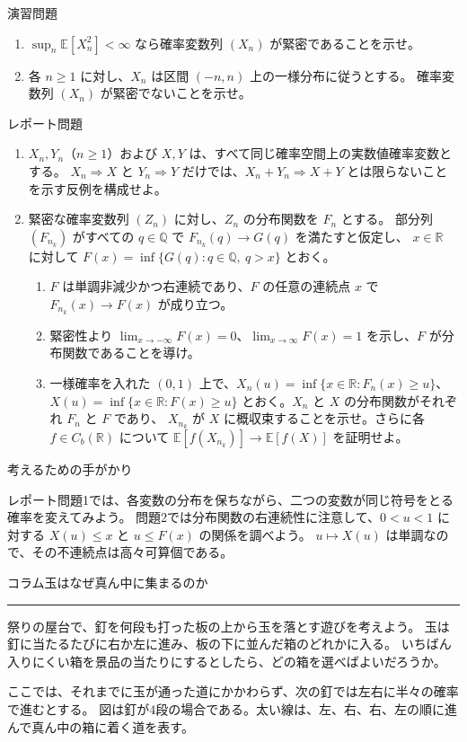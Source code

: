 \documentclass[a4paper,10pt,pdflatex,ja=standard,jafont=ipaex-type1,
  magstyle=real,scale=1]{bxjsarticle}
\newcommand{\coursename}{確率論と統計学 I}
\newcommand{\topic}[1]{\par\vspace{5pt}
  {\large\sffamily\mdseries\color{accent}#1}\par\vspace{2pt}}
\newcommand{\handouttitle}[1]{%
  \begin{center}
    {\Large\color{ink}#1}\par\vspace{3mm}
    {\color{accent}\rule{0.88\linewidth}{0.7pt}}
  \end{center}\vspace{-2mm}}
\newcommand{\columnstart}[1]{\clearpage
  \setlength{\parskip}{2.5pt}
  \fancyhead[L]{\small\color{ink}\coursename{}・コラム}
  \handouttitle{コラム\quad #1}}
\newcommand{\R}{\mathbb R}
\newcommand{\E}{\mathbb E}
\begin{document}
\topic{演習問題}
\begin{enumerate}[label=\arabic*.]
\item $\sup_n\E[X_n^2]<\infty$ なら確率変数列 $(X_n)$ が緊密であることを示せ。
\item 各 $n\ge1$ に対し、$X_n$ は区間 $(-n,n)$ 上の一様分布に従うとする。
確率変数列 $(X_n)$ が緊密でないことを示せ。
\end{enumerate}

\topic{レポート問題}
\begin{enumerate}[label=\arabic*.]
\item $X_n,Y_n$（$n\ge1$）および $X,Y$ は、すべて同じ確率空間上の実数値確率変数とする。
$X_n\Rightarrow X$ と $Y_n\Rightarrow Y$ だけでは、$X_n+Y_n\Rightarrow X+Y$ とは限らないことを示す反例を構成せよ。
\item 緊密な確率変数列 $(Z_n)$ に対し、$Z_n$ の分布関数を $F_n$ とする。
部分列 $(F_{n_k})$ がすべての $q\in\mathbb Q$ で $F_{n_k}(q)\to G(q)$ を満たすと仮定し、
$x\in\R$ に対して $F(x)=\inf\{G(q):q\in\mathbb Q,\ q>x\}$ とおく。
\begin{enumerate}[label=(\arabic*),leftmargin=2.1em]
\item $F$ は単調非減少かつ右連続であり、$F$ の任意の連続点 $x$ で $F_{n_k}(x)\to F(x)$ が成り立つ。
\item 緊密性より $\lim_{x\to-\infty}F(x)=0$、$\lim_{x\to\infty}F(x)=1$ を示し、$F$ が分布関数であることを導け。
\item 一様確率を入れた $(0,1)$ 上で、$X_n(u)=\inf\{x\in\R:F_n(x)\ge u\}$、
$X(u)=\inf\{x\in\R:F(x)\ge u\}$ とおく。$X_n$ と $X$ の分布関数がそれぞれ $F_n$ と $F$ であり、
$X_{n_k}$ が $X$ に概収束することを示せ。さらに各 $f\in C_b(\R)$ について
$\E[f(X_{n_k})]\to\E[f(X)]$ を証明せよ。
\end{enumerate}
\end{enumerate}

\topic{考えるための手がかり}
レポート問題1では、各変数の分布を保ちながら、二つの変数が同じ符号をとる確率を変えてみよう。
問題2では分布関数の右連続性に注意して、$0<u<1$ に対する $X(u)\le x$ と $u\le F(x)$ の関係を調べよう。
$u\mapsto X(u)$ は単調なので、その不連続点は高々可算個である。

\columnstart{玉はなぜ真ん中に集まるのか}
祭りの屋台で、釘を何段も打った板の上から玉を落とす遊びを考えよう。
玉は釘に当たるたびに右か左に進み、板の下に並んだ箱のどれかに入る。
いちばん入りにくい箱を景品の当たりにするとしたら、どの箱を選べばよいだろうか。

ここでは、それまでに玉が通った道にかかわらず、次の釘では左右に半々の確率で進むとする。
図は釘が4段の場合である。太い線は、左、右、右、左の順に進んで真ん中の箱に着く道を表す。
\end{document}
